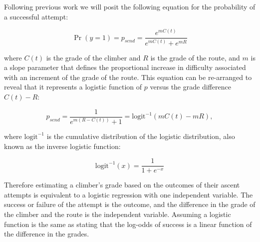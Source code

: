 \documentclass{article}
\begin{document}
Following previous work \cite{scarff2020estimation} we will posit the following equation for the probability of a successful attempt:

\begin{equation}
\Pr(y = 1) = p_{send} = \frac{e^{mC(t)}}{e^{mC(t)} + e^{mR}}
\end{equation}

where $C(t)$ is the grade of the climber and $R$ is the grade of the route, and $m$ is a slope parameter that defines the proportional increase in difficulty associated with an increment of the grade of the route. This equation can be re-arranged to reveal that it represents a logistic function of $p$ versus the grade difference $C(t)-R$:

\begin{equation}
p_{send} = \frac{1}{e^{m(R-C(t))} + 1} = \textrm{logit}^{-1}(mC(t)-mR),
\label{logisticp}
\end{equation}

where $\textrm{logit}^{-1}$ is the cumulative distribution of the logistic distribution, also known as the inverse logistic function:

\begin{equation}
\textrm{logit}^{-1}(x) = \frac{1}{1 + e^{-x}}
\end{equation}

Therefore estimating a climber's grade based on the outcomes of their ascent attempts is equivalent to a logistic regression with one independent variable. The success or failure of the attempt is the outcome, and the difference in the grade of the climber and the route is the independent variable. Assuming a logistic function is the same as stating that the log-odds of success is a linear function of the difference in the grades.

            

\end{document}
